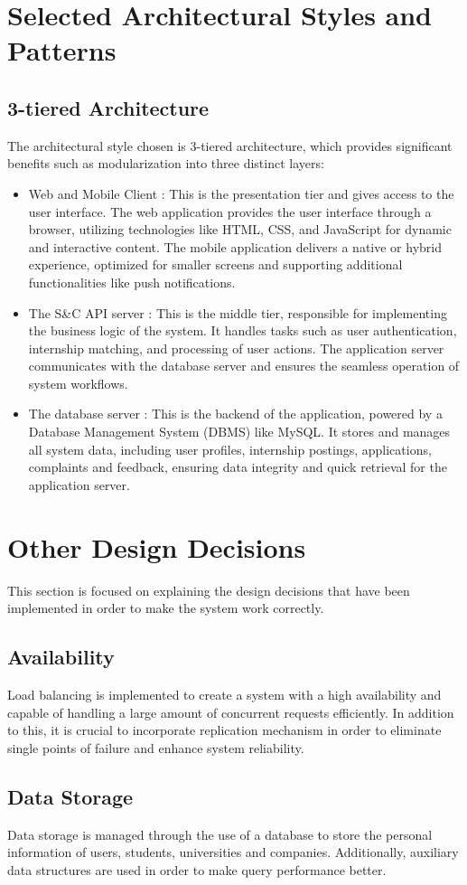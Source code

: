 \section{Selected Architectural Styles and Patterns}
\label{sec:architectural_styles_patterns}
\subsection{3-tiered Architecture}
The architectural style chosen is 3-tiered architecture, which provides significant benefits such as modularization into three distinct layers:
\begin{itemize}
    \item Web and Mobile Client : This is the presentation tier and gives access to the user interface. The web application provides the user interface through a browser, utilizing technologies like HTML, CSS, and JavaScript for dynamic and interactive content. The mobile application delivers a native or hybrid experience, optimized for smaller screens and supporting additional functionalities like push notifications.
    \item The S\&C API server : This is the middle tier, responsible for implementing the business logic of the system. It handles tasks such as user authentication, internship matching, and processing of user actions. The application server communicates with the database server and ensures the seamless operation of system workflows.
    \item The database server : This is the backend of the application, powered by a Database Management System (DBMS) like MySQL. It stores and manages all system data, including user profiles, internship postings, applications, complaints and feedback, ensuring data integrity and quick retrieval for the application server.
\end{itemize}

\section{Other Design Decisions}
\label{sec:other_design_decisions}
This section is focused on explaining the design decisions  that have been implemented in order to make the system work correctly.
\subsection{Availability}
Load balancing is implemented to create a system with a high availability and capable of handling a large amount of concurrent requests efficiently. In addition to this, it is crucial to incorporate replication mechanism in order to eliminate single points of failure and enhance system reliability.
\subsection{Data Storage}
Data storage is managed through the use of a database to store the personal information of users, students, universities and companies. Additionally, auxiliary data structures are used in order to make query performance better. 